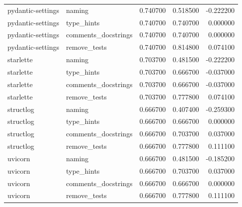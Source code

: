 \begin{tabular}{llrrr}
pydantic-settings & naming & 0.740700 & 0.518500 & -0.222200 \\
pydantic-settings & type\_hints & 0.740700 & 0.740700 & 0.000000 \\
pydantic-settings & comments\_docstrings & 0.740700 & 0.740700 & 0.000000 \\
pydantic-settings & remove\_tests & 0.740700 & 0.814800 & 0.074100 \\
starlette & naming & 0.703700 & 0.481500 & -0.222200 \\
starlette & type\_hints & 0.703700 & 0.666700 & -0.037000 \\
starlette & comments\_docstrings & 0.703700 & 0.666700 & -0.037000 \\
starlette & remove\_tests & 0.703700 & 0.777800 & 0.074100 \\
structlog & naming & 0.666700 & 0.407400 & -0.259300 \\
structlog & type\_hints & 0.666700 & 0.666700 & 0.000000 \\
structlog & comments\_docstrings & 0.666700 & 0.703700 & 0.037000 \\
structlog & remove\_tests & 0.666700 & 0.777800 & 0.111100 \\
uvicorn & naming & 0.666700 & 0.481500 & -0.185200 \\
uvicorn & type\_hints & 0.666700 & 0.703700 & 0.037000 \\
uvicorn & comments\_docstrings & 0.666700 & 0.666700 & 0.000000 \\
uvicorn & remove\_tests & 0.666700 & 0.777800 & 0.111100 \\
\bottomrule
\end{tabular}
